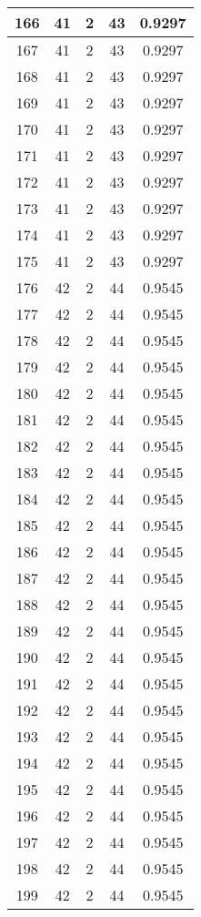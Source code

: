 \documentclass[letterpaper, 12pt]{article}
\begin{document}
\begin{longtable}{|c|c|c|c|c|}
\hline
166 & 41 & 2 & 43 & 0.9297 \\
\hline
167 & 41 & 2 & 43 & 0.9297 \\
\hline
168 & 41 & 2 & 43 & 0.9297 \\
\hline
169 & 41 & 2 & 43 & 0.9297 \\
\hline
170 & 41 & 2 & 43 & 0.9297 \\
\hline
171 & 41 & 2 & 43 & 0.9297 \\
\hline
172 & 41 & 2 & 43 & 0.9297 \\
\hline
173 & 41 & 2 & 43 & 0.9297 \\
\hline
174 & 41 & 2 & 43 & 0.9297 \\
\hline
175 & 41 & 2 & 43 & 0.9297 \\
\hline
176 & 42 & 2 & 44 & 0.9545 \\
\hline
177 & 42 & 2 & 44 & 0.9545 \\
\hline
178 & 42 & 2 & 44 & 0.9545 \\
\hline
179 & 42 & 2 & 44 & 0.9545 \\
\hline
180 & 42 & 2 & 44 & 0.9545 \\
\hline
181 & 42 & 2 & 44 & 0.9545 \\
\hline
182 & 42 & 2 & 44 & 0.9545 \\
\hline
183 & 42 & 2 & 44 & 0.9545 \\
\hline
184 & 42 & 2 & 44 & 0.9545 \\
\hline
185 & 42 & 2 & 44 & 0.9545 \\
\hline
186 & 42 & 2 & 44 & 0.9545 \\
\hline
187 & 42 & 2 & 44 & 0.9545 \\
\hline
188 & 42 & 2 & 44 & 0.9545 \\
\hline
189 & 42 & 2 & 44 & 0.9545 \\
\hline
190 & 42 & 2 & 44 & 0.9545 \\
\hline
191 & 42 & 2 & 44 & 0.9545 \\
\hline
192 & 42 & 2 & 44 & 0.9545 \\
\hline
193 & 42 & 2 & 44 & 0.9545 \\
\hline
194 & 42 & 2 & 44 & 0.9545 \\
\hline
195 & 42 & 2 & 44 & 0.9545 \\
\hline
196 & 42 & 2 & 44 & 0.9545 \\
\hline
197 & 42 & 2 & 44 & 0.9545 \\
\hline
198 & 42 & 2 & 44 & 0.9545 \\
\hline
199 & 42 & 2 & 44 & 0.9545 \\
\hline
\end{longtable}
\end{document}
